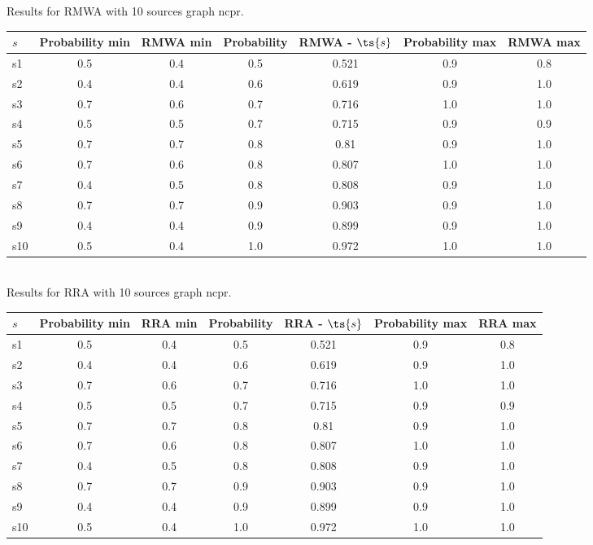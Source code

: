 \documentclass{article}
\begin{document}
\noindent Results for RMWA with 10 sources graph ncpr.

\noindent\begin{tabular}{|l|c|c|c|c|c|c|}
\hline
$s$& Probability min & RMWA min & Probability & RMWA - $\ts{s}$ & Probability max & RMWA max\\
\hline
s1 &0.5 & 0.4 & 0.5 & 0.521 & 0.9 & 0.8\\
\hline
s2 &0.4 & 0.4 & 0.6 & 0.619 & 0.9 & 1.0\\
\hline
s3 &0.7 & 0.6 & 0.7 & 0.716 & 1.0 & 1.0\\
\hline
s4 &0.5 & 0.5 & 0.7 & 0.715 & 0.9 & 0.9\\
\hline
s5 &0.7 & 0.7 & 0.8 & 0.81 & 0.9 & 1.0\\
\hline
s6 &0.7 & 0.6 & 0.8 & 0.807 & 1.0 & 1.0\\
\hline
s7 &0.4 & 0.5 & 0.8 & 0.808 & 0.9 & 1.0\\
\hline
s8 &0.7 & 0.7 & 0.9 & 0.903 & 0.9 & 1.0\\
\hline
s9 &0.4 & 0.4 & 0.9 & 0.899 & 0.9 & 1.0\\
\hline
s10 &0.5 & 0.4 & 1.0 & 0.972 & 1.0 & 1.0\\
\hline
\end{tabular}\\

\noindent Results for RRA with 10 sources graph ncpr.

\noindent\begin{tabular}{|l|c|c|c|c|c|c|}
\hline
$s$& Probability min & RRA min & Probability & RRA - $\ts{s}$ & Probability max & RRA max\\
\hline
s1 &0.5 & 0.4 & 0.5 & 0.521 & 0.9 & 0.8\\
\hline
s2 &0.4 & 0.4 & 0.6 & 0.619 & 0.9 & 1.0\\
\hline
s3 &0.7 & 0.6 & 0.7 & 0.716 & 1.0 & 1.0\\
\hline
s4 &0.5 & 0.5 & 0.7 & 0.715 & 0.9 & 0.9\\
\hline
s5 &0.7 & 0.7 & 0.8 & 0.81 & 0.9 & 1.0\\
\hline
s6 &0.7 & 0.6 & 0.8 & 0.807 & 1.0 & 1.0\\
\hline
s7 &0.4 & 0.5 & 0.8 & 0.808 & 0.9 & 1.0\\
\hline
s8 &0.7 & 0.7 & 0.9 & 0.903 & 0.9 & 1.0\\
\hline
s9 &0.4 & 0.4 & 0.9 & 0.899 & 0.9 & 1.0\\
\hline
s10 &0.5 & 0.4 & 1.0 & 0.972 & 1.0 & 1.0\\
\hline
\end{tabular}\\
\end{document}
